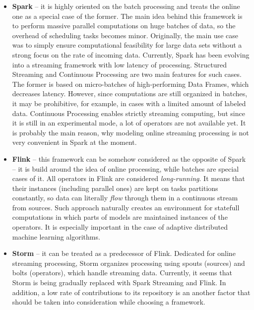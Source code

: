 \documentclass[journal]{IEEEtran}
\begin{document}
\medskip
\begin{itemize}
	
	\item \textbf{Spark} -- it is highly oriented on the batch processing and treats the online one as a special case of the former. The main idea behind this framework is to perform massive parallel computations on huge batches of data, so the overhead of scheduling tasks becomes minor. Originally, the main use case was to simply ensure computational feasibility for large data sets without a strong focus on the rate of incoming data. Currently, Spark has been evolving into a streaming framework with low latency of processing. Structured Streaming and Continuous Processing are two main features for such cases. The former is based on micro-batches of high-performing Data Frames, which decreases latency. However, since computations are still organized in batches, it may be prohibitive, for example, in cases with a limited amount of labeled data. Continuous Processing enables strictly streaming computing, but since it is still in an experimental mode, a lot of operators are not available yet. It is probably the main reason, why modeling online streaming processing is not very convenient in Spark at the moment. 
	\\
	\item \textbf{Flink} -- this framework can be somehow considered as the opposite of Spark -- it is build around the idea of online processing, while batches are special cases of it. All operators in Flink are considered \textit{long-running}. It means that their instances (including parallel ones) are kept on tasks partitions constantly, so data can literally \textit{flow} through them in a continuous stream from sources. Such approach naturally creates an environment for statefull computations in which parts of models are maintained instances of the operators. It is especially important in the case of adaptive distributed machine learning algorithms.
	\\
	\item \textbf{Storm} -- it can be treated as a predecessor of Flink. Dedicated for online streaming processing, Storm organizes processing using spouts (sources) and bolts (operators), which handle streaming data. Currently, it seems that Storm is being gradually replaced with Spark Streaming and Flink. In addition, a low rate of contributions to its repository is an another factor that should be taken into consideration while choosing a framework.
	
\end{itemize}
\end{document}
